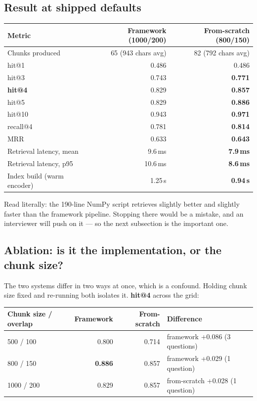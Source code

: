 \documentclass[11pt,a4paper]{article}
\begin{document}
\subsection{Result at shipped defaults}

\begin{center}\small
\begin{tabular}{@{}lrr@{}}
\toprule
\textbf{Metric} & \textbf{Framework (1000/200)} & \textbf{From-scratch (800/150)} \\
\midrule
Chunks produced       & 65 (943 chars avg) & 82 (792 chars avg) \\
hit@1                 & 0.486 & 0.486 \\
hit@3                 & 0.743 & \textbf{0.771} \\
\textbf{hit@4}        & 0.829 & \textbf{0.857} \\
hit@5                 & 0.829 & \textbf{0.886} \\
hit@10                & 0.943 & \textbf{0.971} \\
recall@4              & 0.781 & \textbf{0.814} \\
MRR                   & 0.633 & \textbf{0.643} \\
\midrule
Retrieval latency, mean & 9.6\,ms & \textbf{7.9\,ms} \\
Retrieval latency, p95  & 10.6\,ms & \textbf{8.6\,ms} \\
Index build (warm encoder) & 1.25\,s & \textbf{0.94\,s} \\
\bottomrule
\end{tabular}
\end{center}

\noindent
Read literally: the 190-line NumPy script retrieves slightly better and slightly
faster than the framework pipeline. Stopping there would be a mistake, and an
interviewer will push on it --- so the next subsection is the important one.

\subsection{Ablation: is it the implementation, or the chunk size?}

The two systems differ in two ways at once, which is a confound. Holding chunk
size fixed and re-running both isolates it. \textbf{hit@4} across the grid:

\begin{center}\small
\begin{tabular}{@{}lrrl@{}}
\toprule
\textbf{Chunk size / overlap} & \textbf{Framework} & \textbf{From-scratch} & \textbf{Difference} \\
\midrule
500 / 100   & 0.800 & 0.714 & framework +0.086 (3 questions) \\
800 / 150   & \textbf{0.886} & 0.857 & framework +0.029 (1 question) \\
1000 / 200  & 0.829 & 0.857 & from-scratch +0.028 (1 question) \\
\bottomrule
\end{tabular}
\end{center}
\end{document}
